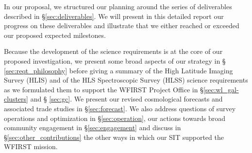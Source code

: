 \begin{summary}
In our proposal, we structured our planning around the series of deliverables
described in \S \ref{sec:deliverables}. We will present in this detailed report our progress on
these deliverables and illustrate that we either reached or exceeded our proposed
expected milestones.

Because the development of the science requirements is at the core of our proposed
investigation, we present some broad aspects of our strategy in \S
\ref{sec:reqt_philosophy} before giving a summary of the High Latitude Imaging
Survey (HLIS) and of the HLS Spectroscopic Survey (HLSS) science requirements as we formulated them to support the WFIRST Project Office in \S \ref{sec:wl_gal-clusters} and \S
\ref{sec:gc}. We present our revised cosmological forecasts and associated trade studies in
\S \ref{sec:forecast}. We also address questions of survey operations and
optimization in \S \ref{sec:operation}, our actions towards broad community engagement
in \S \ref{sec:engagement} and discuss in \S \ref{sec:other_contributions} the
other ways in which our SIT supported the WFIRST mission.
\end{summary}



